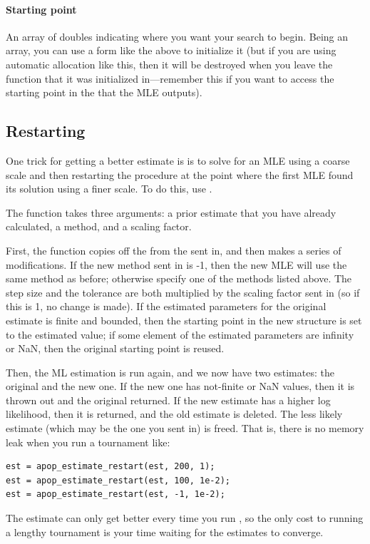 \paragraph{Starting point} An array of doubles indicating where you want
your search to begin. Being an array, you can use a form like the above
to initialize it (but if you are using automatic allocation like this, then it will be destroyed when you leave the
function that it was initialized in---remember this if you want to
access the starting point in the  that the MLE outputs).


\subsection{Restarting} 
\label{restart} One trick for getting a better estimate is is to solve
for an MLE using a coarse scale and then restarting the procedure at
the point where the first MLE found its solution using a finer scale.
To do this, use .

The function takes three arguments: a prior estimate that you have
already calculated, a method, and a scaling factor. 

First, the function copies off the 
from the  sent in, and then makes a series of
modifications.  If the new method sent in is -1, then the new MLE will
use the same method as before; otherwise specify one of the methods
listed above. The step size and the tolerance are both multiplied by the
scaling factor sent in (so if this is 1, no change is made). If the
estimated parameters for the original estimate is finite and bounded, then 
the starting point in the new 
structure is set to the estimated value; if some element of the
estimated parameters are infinity or NaN, then the original starting
point is reused.

Then, the ML estimation is run again, and we now have two estimates: the
original and the new one. If the new one has not-finite or NaN values,
then it is thrown out and the original returned. If the new estimate 
has a higher log likelihood, then it is returned, and the old estimate
is deleted.  The less likely estimate (which may be the one you sent in) is freed. That is,
there is no memory leak when you run a tournament like:
\begin{lstlisting}
est = apop_estimate_restart(est, 200, 1);
est = apop_estimate_restart(est, 100, 1e-2);
est = apop_estimate_restart(est, -1, 1e-2);
\end{lstlisting}
The estimate can only get better every time you run
, so the only cost to running a lengthy
tournament is your time waiting for the estimates to converge.

